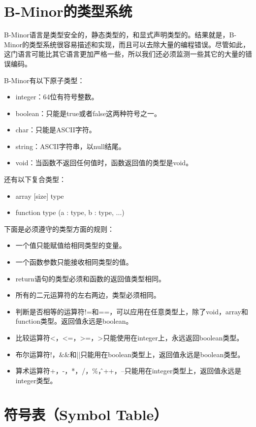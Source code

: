 \documentclass[cn,11pt,chinese]{elegantbook}
\begin{document}
\section{B-Minor的类型系统}

B-Minor语言是类型安全的，静态类型的，和显式声明类型的。结果就是，B-Minor的类型系统很容易描述和实现，而且可以去除大量的编程错误。尽管如此，这门语言可能比其它语言更加严格一些，所以我们还必须监测一些其它的大量的错误编码。

B-Minor有以下原子类型：

\begin{itemize}
  \item integer：64位有符号整数。
  \item boolean：只能是true或者false这两种符号之一。
  \item char：只能是ASCII字符。
  \item string：ASCII字符串，以null结尾。
  \item void：当函数不返回任何值时，函数返回值的类型是void。
\end{itemize}

还有以下复合类型：

\begin{itemize}
  \item array [size] type
  \item function type (a : type, b :  type, ...)
\end{itemize}

下面是必须遵守的类型方面的规则：

\begin{itemize}
  \item 一个值只能赋值给相同类型的变量。
  \item 一个函数参数只能接收相同类型的值。
  \item return语句的类型必须和函数的返回值类型相同。
  \item 所有的二元运算符的左右两边，类型必须相同。
  \item 判断是否相等的运算符!=和==，可以应用在任意类型上，除了void，array和function类型。返回值永远是boolean。
  \item 比较运算符<，<=，>=，>只能使用在integer上，永远返回boolean类型。
  \item 布尔运算符!，\&\&和||只能用在boolean类型上，返回值永远是boolean类型。
  \item 算术运算符+，-，*，/，\%，\^，++，--只能用在integer类型上，返回值永远是integer类型。
\end{itemize}

\section{符号表（Symbol Table）}
\end{document}
